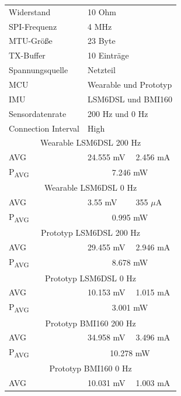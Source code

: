 \begin{figure}[!hbtp]
  \begin{minipage}{0.5\textwidth}
    \centering
    \begin{tabular}{|l|l|l|}
      \hline
      Widerstand & \multicolumn{2}{l|}{10 Ohm}\\
      SPI-Frequenz & \multicolumn{2}{l|}{4 MHz}\\
      MTU-Größe & \multicolumn{2}{l|}{23 Byte}\\
      TX-Buffer & \multicolumn{2}{l|}{10 Einträge}\\
      Spannungsquelle & \multicolumn{2}{l|}{Netzteil}\\
      MCU & \multicolumn{2}{l|}{Wearable und Prototyp}\\
      IMU & \multicolumn{2}{l|}{LSM6DSL und BMI160}\\
      Sensordatenrate & \multicolumn{2}{l|}{200 Hz und 0 Hz}\\
      Connection Interval & \multicolumn{2}{l|}{High}\\
      \hline
      \multicolumn{3}{|c|}{Wearable LSM6DSL 200 Hz}\\
      AVG & 24.555 mV & 2.456 mA\\
      P\textsubscript{AVG} & \multicolumn{2}{c|}{7.246 mW}\\
      \hline
      \multicolumn{3}{|c|}{Wearable LSM6DSL 0 Hz}\\
      AVG & 3.55 mV & 355 $\mu$A\\
      P\textsubscript{AVG} & \multicolumn{2}{c|}{0.995 mW}\\
      \hline
      \multicolumn{3}{|c|}{Prototyp LSM6DSL 200 Hz}\\
      AVG & 29.455 mV & 2.946 mA\\
      P\textsubscript{AVG} & \multicolumn{2}{c|}{8.678 mW}\\
      \hline
      \multicolumn{3}{|c|}{Prototyp LSM6DSL 0 Hz}\\
      AVG & 10.153 mV & 1.015 mA\\
      P\textsubscript{AVG} & \multicolumn{2}{c|}{3.001 mW}\\
      \hline
      \multicolumn{3}{|c|}{Prototyp BMI160 200 Hz}\\
      AVG & 34.958 mV & 3.496 mA\\
      P\textsubscript{AVG} & \multicolumn{2}{c|}{10.278 mW}\\
      \hline
      \multicolumn{3}{|c|}{Prototyp BMI160 0 Hz}\\
      AVG & 10.031 mV & 1.003 mA\\

\end{tabular}
\end{minipage}
\end{figure}
